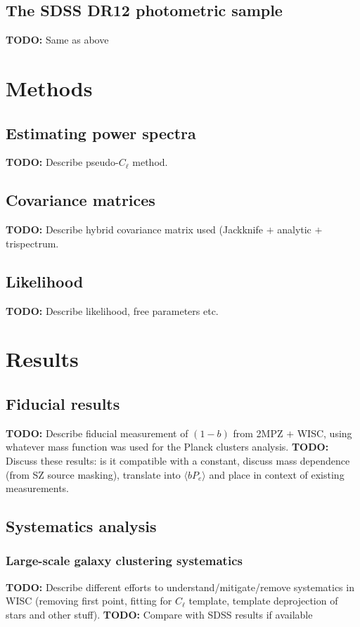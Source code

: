 \documentclass[useAMS,usenatbib]{mn2e}
\newcommand{\TODO}[1]{{\bf TODO:} #1}
\begin{document}
  \subsection{The SDSS DR12 photometric sample}\label{ssec:data.g2}
    \TODO{Same as above}

\section{Methods}\label{sec:methods}
  \subsection{Estimating power spectra}\label{ssec:methods.cls}
    \TODO{Describe pseudo-$C_\ell$ method.}
  \subsection{Covariance matrices}\label{ssec:methods.cov}
    \TODO{Describe hybrid covariance matrix used (Jackknife $+$ analytic $+$ trispectrum.}
  \subsection{Likelihood}\label{ssec:methods.like}
    \TODO{Describe likelihood, free parameters etc.}

\section{Results}\label{sec:results}
  \subsection{Fiducial results}\label{ssec:results.fid}
    \TODO{Describe fiducial measurement of $(1-b)$ from 2MPZ $+$ WISC, using whatever mass function was used for the Planck clusters analysis.}
    \TODO{Discuss these results: is it compatible with a constant, discuss mass dependence (from SZ source masking), translate into $\langle bP_e \rangle$ and place in context of existing measurements.}

  \subsection{Systematics analysis}\label{ssec:results.syst}
    \subsubsection{Large-scale galaxy clustering systematics}\label{sssec:results.syst.gg}
      \TODO{Describe different efforts to understand/mitigate/remove systematics in WISC (removing first point, fitting for $C_\ell$ template, template deprojection of stars and other stuff).}
      \TODO{Compare with SDSS results if available}
\end{document}
